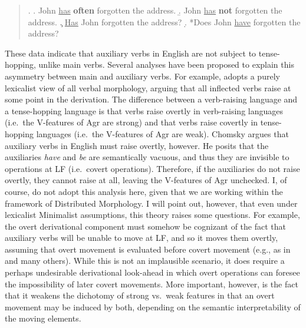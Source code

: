 \singlespacing
\begin{quote}
\ex.
\a. John \underline{has} {\bf often} forgotten the address.
\b. John \underline{has} {\bf not} forgotten the address.
\c. \underline{Has} John forgotten the address?
\d. *Does John \underline{have} forgotten the address?

\end{quote}
\onehalfspacing
These data indicate that auxiliary verbs in English are not subject to tense-hopping, unlike main verbs. Several analyses have been proposed to explain this asymmetry between main and auxiliary verbs. For example, \citet{chomsky1993} adopts a purely lexicalist view of all verbal morphology, arguing that all inflected verbs raise at some point in the derivation. The difference between a verb-raising language and a tense-hopping language is that verbs raise overtly in verb-raising languages (i.e.\ the V-features of Agr are strong) and that verbs raise covertly in tense-hopping languages (i.e.\ the V-features of Agr are weak). Chomsky argues that auxiliary verbs in English must raise overtly, however. He posits that the auxiliaries {\it have} and {\it be} are semantically vacuous, and thus they are invisible to operations at LF (i.e.\ covert operations). Therefore, if the auxiliaries do not raise overtly, they cannot raise at all, leaving the V-features of Agr unchecked. I, of course, do not adopt this analysis here, given that we are working within the framework of Distributed Morphology. I will point out, however, that even under lexicalist Minimalist assumptions, this theory raises some questions. For example, the overt derivational component must somehow be cognizant of the fact that auxiliary verbs will be unable to move at LF, and so it moves them overtly, assuming that overt movement is evaluated before covert movement (e.g., as in  and many others). While this is not an implausible scenario, it does require a perhaps undesirable derivational look-ahead in which overt operations can foresee the impossibility of later covert movements. More important, however, is the fact that it weakens the dichotomy of strong vs.\ weak features in that an overt movement may be induced by both, depending on the semantic interpretability of the moving elements.

